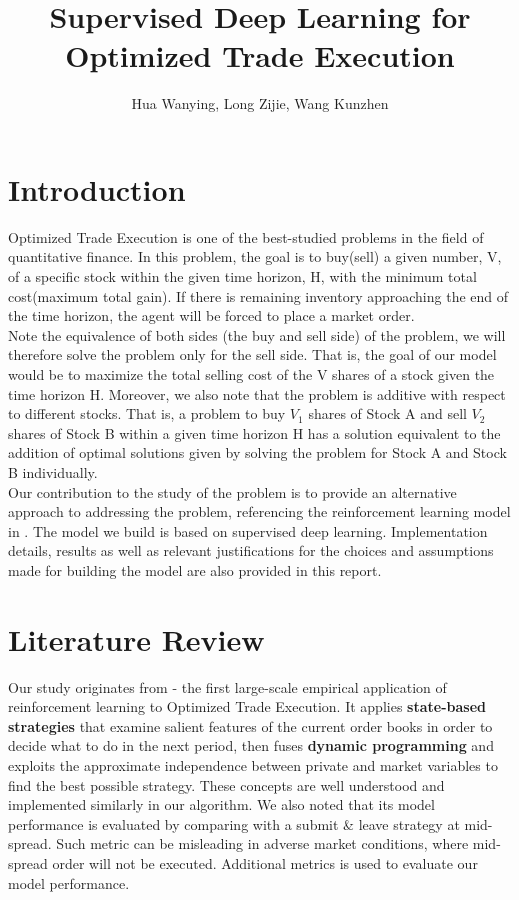 \documentclass[12pt]{extarticle}
\title{Supervised Deep Learning for Optimized Trade Execution}
\author{Hua Wanying, Long Zijie, Wang Kunzhen}
\begin{document}
\maketitle

\section{Introduction}
Optimized Trade Execution is one of the best-studied problems in the field
of quantitative finance. In this problem, the goal is to buy(sell) a given
number, V, of a specific stock within the given time horizon, H, with the
minimum total cost(maximum total gain). If there is remaining inventory
approaching the end of the time horizon, the agent will be forced to place
a market order. \\


\noindent Note the equivalence of both sides (the buy and sell side) of the
problem, we will therefore solve the problem only for the sell side. That is,
the goal of our model would be to maximize the total selling cost of the
V shares of a stock given the time horizon H. Moreover, we also note that
the problem is additive with respect to different stocks. That is, a problem
to buy $V_1$ shares of Stock A and sell $V_2$ shares of Stock B within a given
time horizon H has a solution equivalent to the addition of optimal solutions given by
solving the problem for Stock A and Stock B individually.\\


\noindent Our contribution to the study of the problem is to provide an alternative
approach to addressing the problem, referencing the reinforcement learning model in
\cite{reinforcement}. The model we build is based on supervised deep learning.
Implementation details, results as well as relevant justifications for the choices
and assumptions made for building the model are also provided in this report.
\section{Literature Review}

Our study originates from \cite{reinforcement} - the first large-scale empirical application of reinforcement learning to Optimized Trade Execution. It applies \textbf{state-based strategies} that examine salient features of the current order books in order to decide what to do in the next period, then fuses \textbf{dynamic programming} and exploits the approximate independence between private and market variables to find the best possible strategy. These concepts are well understood and implemented similarly in our algorithm. We also noted that its model performance is evaluated by comparing with a submit \& leave strategy at mid-spread. Such metric can be misleading in adverse market conditions, where mid-spread order will not be executed. Additional metrics is used to evaluate our model performance.
\end{document}
